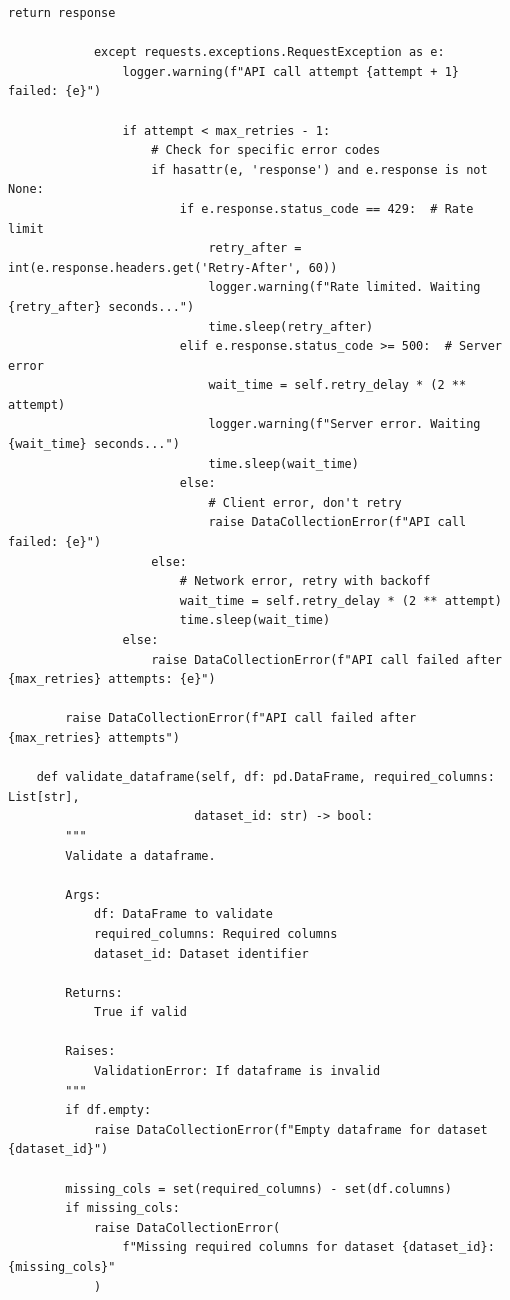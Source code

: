\documentclass[a4paper,11pt]{article}
\begin{document}
\begin{lstlisting}[style=pythonstyle]
                return response
                
            except requests.exceptions.RequestException as e:
                logger.warning(f"API call attempt {attempt + 1} failed: {e}")
                
                if attempt < max_retries - 1:
                    # Check for specific error codes
                    if hasattr(e, 'response') and e.response is not None:
                        if e.response.status_code == 429:  # Rate limit
                            retry_after = int(e.response.headers.get('Retry-After', 60))
                            logger.warning(f"Rate limited. Waiting {retry_after} seconds...")
                            time.sleep(retry_after)
                        elif e.response.status_code >= 500:  # Server error
                            wait_time = self.retry_delay * (2 ** attempt)
                            logger.warning(f"Server error. Waiting {wait_time} seconds...")
                            time.sleep(wait_time)
                        else:
                            # Client error, don't retry
                            raise DataCollectionError(f"API call failed: {e}")
                    else:
                        # Network error, retry with backoff
                        wait_time = self.retry_delay * (2 ** attempt)
                        time.sleep(wait_time)
                else:
                    raise DataCollectionError(f"API call failed after {max_retries} attempts: {e}")
        
        raise DataCollectionError(f"API call failed after {max_retries} attempts")
    
    def validate_dataframe(self, df: pd.DataFrame, required_columns: List[str], 
                          dataset_id: str) -> bool:
        """
        Validate a dataframe.
        
        Args:
            df: DataFrame to validate
            required_columns: Required columns
            dataset_id: Dataset identifier
            
        Returns:
            True if valid
            
        Raises:
            ValidationError: If dataframe is invalid
        """
        if df.empty:
            raise DataCollectionError(f"Empty dataframe for dataset {dataset_id}")
        
        missing_cols = set(required_columns) - set(df.columns)
        if missing_cols:
            raise DataCollectionError(
                f"Missing required columns for dataset {dataset_id}: {missing_cols}"
            )
        

\end{lstlisting}
\end{document}
